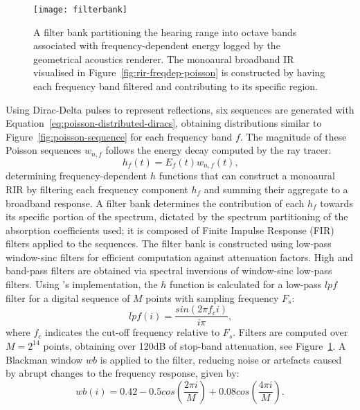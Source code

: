 \begin{figure}[htbp]
    \centering
    \texttt{[image: filterbank]}
    \caption{A filter bank partitioning the hearing range into octave bands associated with frequency-dependent energy logged by the geometrical acoustics renderer. The monoaural broadband IR visualised in Figure~\ref{fig:rir-freqdep-poisson} is constructed by having each frequency band filtered and contributing to its specific region. }
    \label{fig:filterbank}
\end{figure}
Using Dirac-Delta pulses to represent reflections, six sequences are generated with Equation~\ref{eq:poisson-distributed-diracs}, obtaining distributions similar to Figure~\ref{fig:poisson-sequence} for each frequency band $f$. The magnitude of these Poisson sequences $w_{n,f}$ follows the energy decay computed by the ray tracer: 
\begin{equation}
    h_f(t) = E_f(t)w_{n,f}(t)\textrm{,}
\end{equation}
determining frequency-dependent $h$ functions that can construct a monoaural RIR by filtering each frequency component $h_f$ and summing their aggregate to a broadband response. A filter bank determines the contribution of each $h_f$ towards its specific portion of the spectrum, dictated by the spectrum partitioning of the absorption coefficients used; it is composed of Finite Impulse Response (FIR) filters applied to the sequences. The filter bank is constructed using low-pass window-sinc filters for efficient computation against attenuation factors. High and band-pass filters are obtained via spectral inversions of window-sinc low-pass filters. Using \cite{smith1997scientist}'s implementation, the $h$ function is calculated for a low-pass $lpf$ filter for a digital sequence of $M$ points with sampling frequency $F_s$:
\begin{equation}
    lpf(i) = \frac{sin(2\pi f_c i)}{i\pi} \textrm{,}
\end{equation}
where $f_c$ indicates the cut-off frequency relative to $F_s$. Filters are computed over $M = 2^{14}$ points, obtaining over 120dB of stop-band attenuation, see Figure~\ref{fig:filterbank}. A Blackman window $wb$ is applied to the filter, reducing noise or artefacts caused by abrupt changes to the frequency response, given by:
\begin{equation}
    wb(i) = 0.42 - 0.5cos(\frac{2\pi i}{M}) + 0.08cos(\frac{4\pi i}{M})\textrm{.}
\end{equation}

